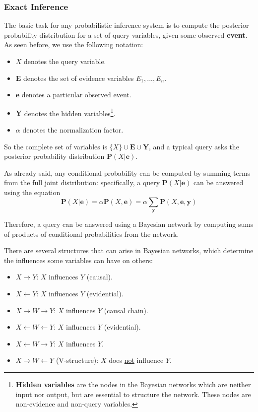 \documentclass{article}
\begin{document}
\subsubsection{Exact Inference}
The basic task for any probabilistic inference system is to compute the posterior probability distribution for a set of query variables, given some observed \textbf{event}. As seen before, we use the following notation:
\begin{itemize}
    \item $X$ denotes the query variable.
    \item $\textbf{E}$ denotes the set of evidence variables $E_1, ..., E_n$.
    \item $\textbf{e}$ denotes a particular observed event.
    \item $\textbf{Y}$ denotes the hidden variables\footnote{\textbf{Hidden variables} are the nodes in the Bayesian networks which are neither input nor output, but are essential to structure the network. These nodes are non-evidence and non-query variables.}.
    \item $\alpha$ denotes the normalization factor. 
\end{itemize}
So the complete set of variables is $\{X\}\cup\textbf{E}\cup\textbf{Y}$, and a typical query asks the posterior probability distribution $\textbf{P}(X|\textbf{e})$.

As already said, any conditional probability can be computed by summing terms from the full joint distribution: specifically, a query $\textbf{P}(X|\textbf{e})$ can be answered using the equation 
$$\textbf{P}(X|\textbf{e})=\alpha\textbf{P}(X,\textbf{e})=\alpha\sum_\textbf{y}\textbf{P}(X,\textbf{e},\textbf{y})$$

Therefore, a query can be answered using a Bayesian network by computing sums of products of conditional probabilities from the network.

There are several structures that can arise in Bayesian networks, which determine the influences some variables can have on others:
\begin{itemize}
    \item $X \rightarrow Y$: $X$ influences $Y$ (causal).
    \item $X \leftarrow Y$: $X$ influences $Y$ (evidential).
    \item $X \rightarrow W \rightarrow Y$: $X$ influences $Y$ (causal chain).
    \item $X \leftarrow W \leftarrow Y$: $X$ influences $Y$ (evidential).
    \item $X \leftarrow W \rightarrow Y$: $X$ influences $Y$.
    \item $X \rightarrow W \leftarrow Y$ (V-structure): $X$ does \underline{not} influence $Y$.
\end{itemize}
\end{document}

